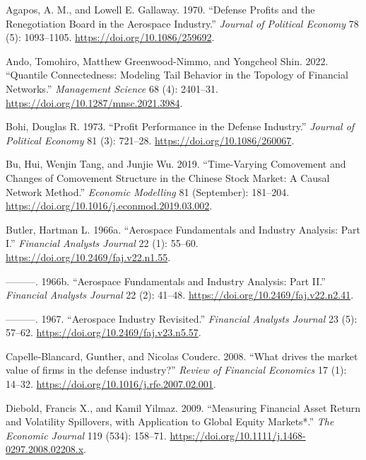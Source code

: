 \documentclass[
  letterpaper,
  DIV=11,
  numbers=noendperiod]{scrartcl}
\newlength{\cslhangindent}
\newlength{\cslentryspacingunit} %
\newenvironment{CSLReferences}[2] %
 {%
  \setlength{\parindent}{0pt}
  \ifodd #1
  \let\oldpar\par
  \def\par{\hangindent=\cslhangindent\oldpar}
  \fi
  \setlength{\parskip}{#2\cslentryspacingunit}
 }%
 {}
\begin{document}
\hypertarget{refs}{}
\begin{CSLReferences}{1}{0}
\leavevmode{}%
Agapos, A. M., and Lowell E. Gallaway. 1970. {``Defense Profits and the
Renegotiation Board in the Aerospace Industry.''} \emph{Journal of
Political Economy} 78 (5): 1093--1105.
\url{https://doi.org/10.1086/259692}.

\leavevmode{}%
Ando, Tomohiro, Matthew Greenwood-Nimmo, and Yongcheol Shin. 2022.
{``{Quantile Connectedness: Modeling Tail Behavior in the Topology of
Financial Networks}.''} \emph{Management Science} 68 (4): 2401--31.
\url{https://doi.org/10.1287/mnsc.2021.3984}.

\leavevmode{}%
Bohi, Douglas R. 1973. {``Profit Performance in the Defense Industry.''}
\emph{Journal of Political Economy} 81 (3): 721--28.
\url{https://doi.org/10.1086/260067}.

\leavevmode{}%
Bu, Hui, Wenjin Tang, and Junjie Wu. 2019. {``Time-Varying Comovement
and Changes of Comovement Structure in the Chinese Stock Market: A
Causal Network Method.''} \emph{Economic Modelling} 81 (September):
181--204. \url{https://doi.org/10.1016/j.econmod.2019.03.002}.

\leavevmode{}%
Butler, Hartman L. 1966a. {``Aerospace Fundamentals and Industry
Analysis: Part I.''} \emph{Financial Analysts Journal} 22 (1): 55--60.
\url{https://doi.org/10.2469/faj.v22.n1.55}.

\leavevmode{}%
---------. 1966b. {``Aerospace Fundamentals and Industry Analysis: Part
II.''} \emph{Financial Analysts Journal} 22 (2): 41--48.
\url{https://doi.org/10.2469/faj.v22.n2.41}.

\leavevmode{}%
---------. 1967. {``Aerospace Industry Revisited.''} \emph{Financial
Analysts Journal} 23 (5): 57--62.
\url{https://doi.org/10.2469/faj.v23.n5.57}.

\leavevmode{}%
Capelle‐Blancard, Gunther, and Nicolas Couderc. 2008. {``{What drives
the market value of firms in the defense industry?}''} \emph{Review of
Financial Economics} 17 (1): 14--32.
\url{https://doi.org/10.1016/j.rfe.2007.02.001}.

\leavevmode{}%
Diebold, Francis X., and Kamil Yilmaz. 2009. {``{Measuring Financial
Asset Return and Volatility Spillovers, with Application to Global
Equity Markets*}.''} \emph{The Economic Journal} 119 (534): 158--71.
\url{https://doi.org/10.1111/j.1468-0297.2008.02208.x}.


\end{CSLReferences}
\end{document}
